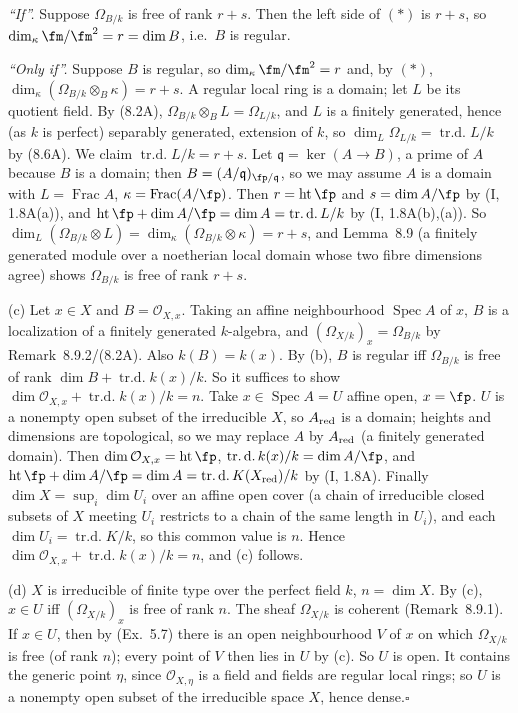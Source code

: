 \documentclass[11pt]{article}
\begin{document}
\emph{``If''.} Suppose $\Omega_{B/k}$ is free of rank $r+s$. Then the left side of $(*)$ is $r+s$, so $\dim_\kappa\fm/\fm^2=r=\dim B$, i.e.\ $B$ is regular.

\emph{``Only if''.} Suppose $B$ is regular, so $\dim_\kappa\fm/\fm^2=r$ and, by $(*)$, $\dim_\kappa(\Omega_{B/k}\otimes_B\kappa)=r+s$. A regular local ring is a domain; let $L$ be its quotient field. By (8.2A), $\Omega_{B/k}\otimes_BL=\Omega_{L/k}$, and $L$ is a finitely generated, hence (as $k$ is perfect) separably generated, extension of $k$, so $\dim_L\Omega_{L/k}=\operatorname{tr.d.}L/k$ by (8.6A). We claim $\operatorname{tr.d.}L/k=r+s$. Let $\mathfrak q=\ker(A\to B)$, a prime of $A$ because $B$ is a domain; then $B=(A/\mathfrak q)_{\fp/\mathfrak q}$, so we may assume $A$ is a domain with $L=\operatorname{Frac}A$, $\kappa=\operatorname{Frac}(A/\fp)$. Then $r=\operatorname{ht}\fp$ and $s=\dim A/\fp$ by (I, 1.8A(a)), and $\operatorname{ht}\fp+\dim A/\fp=\dim A=\operatorname{tr.d.}L/k$ by (I, 1.8A(b),(a)). So $\dim_L(\Omega_{B/k}\otimes L)=\dim_\kappa(\Omega_{B/k}\otimes\kappa)=r+s$, and Lemma~8.9 (a finitely generated module over a noetherian local domain whose two fibre dimensions agree) shows $\Omega_{B/k}$ is free of rank $r+s$.

(c) Let $x\in X$ and $B=\mathcal O_{X,x}$. Taking an affine neighbourhood $\operatorname{Spec}A$ of $x$, $B$ is a localization of a finitely generated $k$-algebra, and $(\Omega_{X/k})_x=\Omega_{B/k}$ by Remark~8.9.2/(8.2A). Also $k(B)=k(x)$. By (b), $B$ is regular iff $\Omega_{B/k}$ is free of rank $\dim B+\operatorname{tr.d.}k(x)/k$. So it suffices to show $\dim\mathcal O_{X,x}+\operatorname{tr.d.}k(x)/k=n$. Take $x\in\operatorname{Spec}A=U$ affine open, $x=\fp$. $U$ is a nonempty open subset of the irreducible $X$, so $A_{\rm red}$ is a domain; heights and dimensions are topological, so we may replace $A$ by $A_{\rm red}$ (a finitely generated domain). Then $\dim\mathcal O_{X,x}=\operatorname{ht}\fp$, $\operatorname{tr.d.}k(x)/k=\dim A/\fp$, and $\operatorname{ht}\fp+\dim A/\fp=\dim A=\operatorname{tr.d.}K(X_{\rm red})/k$ by (I, 1.8A). Finally $\dim X=\sup_i\dim U_i$ over an affine open cover (a chain of irreducible closed subsets of $X$ meeting $U_i$ restricts to a chain of the same length in $U_i$), and each $\dim U_i=\operatorname{tr.d.}K/k$, so this common value is $n$. Hence $\dim\mathcal O_{X,x}+\operatorname{tr.d.}k(x)/k=n$, and (c) follows.

(d) $X$ is irreducible of finite type over the perfect field $k$, $n=\dim X$. By (c), $x\in U$ iff $(\Omega_{X/k})_x$ is free of rank $n$. The sheaf $\Omega_{X/k}$ is coherent (Remark~8.9.1). If $x\in U$, then by (Ex.~5.7) there is an open neighbourhood $V$ of $x$ on which $\Omega_{X/k}$ is free (of rank $n$); every point of $V$ then lies in $U$ by (c). So $U$ is open. It contains the generic point $\eta$, since $\mathcal O_{X,\eta}$ is a field and fields are regular local rings; so $U$ is a nonempty open subset of the irreducible space $X$, hence dense.\hfill$\square$
\end{document}
